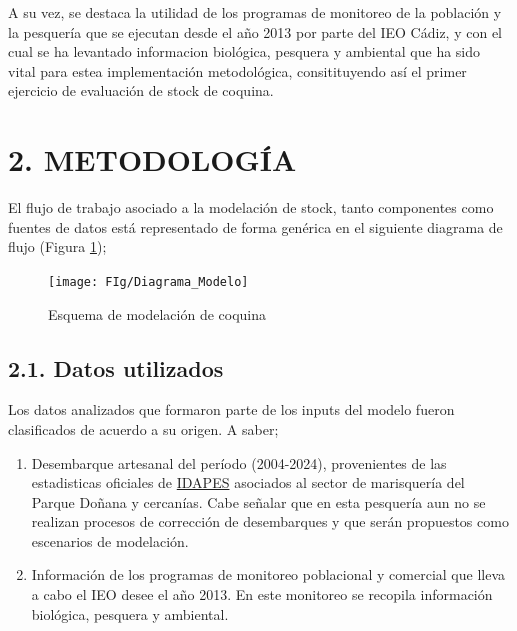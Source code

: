 \documentclass[
]{article}
\begin{document}
A su vez, se destaca la utilidad de los programas de monitoreo de la población y la pesquería que se ejecutan desde el año 2013 por parte del IEO Cádiz, y con el cual se ha levantado informacion biológica, pesquera y ambiental que ha sido vital para estea implementación metodológica, consitituyendo así el primer ejercicio de evaluación de stock de coquina.

\hypertarget{metodologuxeda}{%
\section{2. METODOLOGÍA}\label{metodologuxeda}}

El flujo de trabajo asociado a la modelación de stock, tanto componentes como fuentes de datos está representado de forma genérica en el siguiente diagrama de flujo (Figura \ref{fig:esq});

\begin{figure}

{\centering \texttt{[image: FIg/Diagrama\_Modelo]} 

}

\caption{\label{fig:esq}Esquema de modelación de coquina}\label{fig:esq}
\end{figure}

\pagebreak

\hypertarget{datos-utilizados}{%
\subsection{2.1. Datos utilizados}\label{datos-utilizados}}

Los datos analizados que formaron parte de los inputs del modelo fueron clasificados de acuerdo a su origen. A saber;

\begin{enumerate}
\def\labelenumi{\alph{enumi}.}
\item
  Desembarque artesanal del período (2004-2024), provenientes de las estadisticas oficiales de \href{https://www.juntadeandalucia.es/agriculturaypesca/idapes/servlet/FrontController}{IDAPES} asociados al sector de marisquería del Parque Doñana y cercanías. Cabe señalar que en esta pesquería aun no se realizan procesos de corrección de desembarques y que serán propuestos como escenarios de modelación.
\item
  Información de los programas de monitoreo poblacional y comercial que lleva a cabo el IEO desee el año 2013. En este monitoreo se recopila información biológica, pesquera y ambiental.
\end{enumerate}
\end{document}
